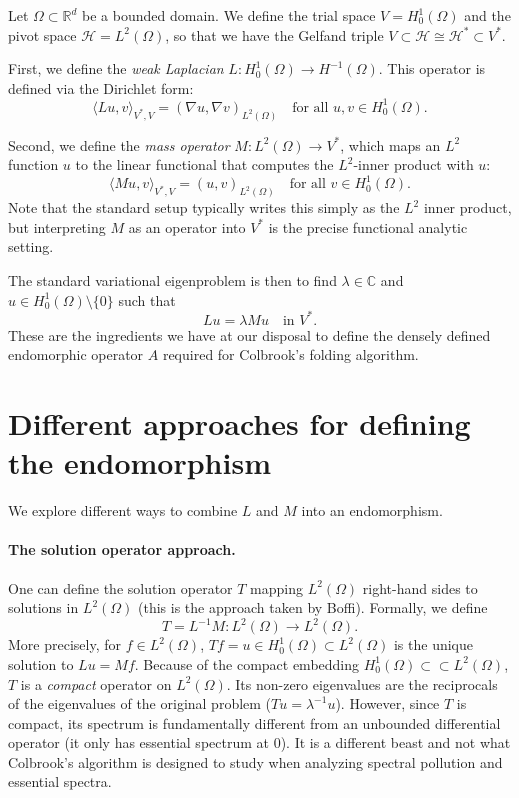 \documentclass[11pt,a4paper]{article}
\newcommand{\Hb}{\mathcal{H}}
\newcommand{\R}{\mathbb{R}}
\newcommand{\C}{\mathbb{C}}
\begin{document}
Let $\Omega \subset \R^d$ be a bounded domain. We define the trial space $V = H^1_0(\Omega)$ and the pivot space $\Hb = L^2(\Omega)$, so that we have the Gelfand triple $V \subset \Hb \cong \Hb^* \subset V^*$.

First, we define the \emph{weak Laplacian} $L \colon H^1_0(\Omega) \to H^{-1}(\Omega)$. This operator is defined via the Dirichlet form:
\begin{equation}
    \langle L u, v \rangle_{V^*, V} = (\nabla u, \nabla v)_{L^2(\Omega)} \quad \text{for all } u, v \in H^1_0(\Omega).
\end{equation}

Second, we define the \emph{mass operator} $M \colon L^2(\Omega) \to V^*$, which maps an $L^2$ function $u$ to the linear functional that computes the $L^2$-inner product with $u$:
\begin{equation}
    \langle M u, v \rangle_{V^*, V} = (u, v)_{L^2(\Omega)} \quad \text{for all } v \in H^1_0(\Omega).
\end{equation}
Note that the standard setup typically writes this simply as the $L^2$ inner product, but interpreting $M$ as an operator into $V^*$ is the precise functional analytic setting.

The standard variational eigenproblem is then to find $\lambda \in \C$ and $u \in H^1_0(\Omega) \setminus \{0\}$ such that
\begin{equation}
    L u = \lambda M u \quad \text{in } V^*.
\end{equation}
These are the ingredients we have at our disposal to define the densely defined endomorphic operator $A$ required for Colbrook's folding algorithm.

\section{Different approaches for defining the endomorphism}

We explore different ways to combine $L$ and $M$ into an endomorphism.

\paragraph{The solution operator approach.}
One can define the solution operator $T$ mapping $L^2(\Omega)$ right-hand sides to solutions in $L^2(\Omega)$ (this is the approach taken by Boffi). Formally, we define
\begin{equation}
    T = L^{-1} M \colon L^2(\Omega) \to L^2(\Omega).
\end{equation}
More precisely, for $f \in L^2(\Omega)$, $Tf = u \in H^1_0(\Omega) \subset L^2(\Omega)$ is the unique solution to $L u = M f$.
Because of the compact embedding $H^1_0(\Omega) \subset\subset L^2(\Omega)$, $T$ is a \emph{compact} operator on $L^2(\Omega)$. Its non-zero eigenvalues are the reciprocals of the eigenvalues of the original problem ($T u = \lambda^{-1} u$). 
However, since $T$ is compact, its spectrum is fundamentally different from an unbounded differential operator (it only has essential spectrum at $0$). It is a different beast and not what Colbrook's algorithm is designed to study when analyzing spectral pollution and essential spectra.
\end{document}
